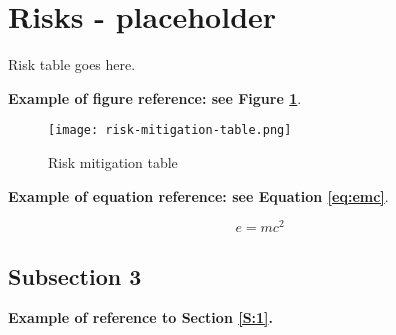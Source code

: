 \section{Risks - placeholder}

Risk table goes here.

\textbf{Example of figure reference: see Figure \ref{fig:example}}. 
\lipsum[5]

\begin{figure}[ht]
\centering\texttt{[image: risk-mitigation-table.png]}
\caption{Risk mitigation table}
\label{fig:example}
\end{figure}

\textbf{Example of equation reference: see Equation \eqref{eq:emc}}. 
\lipsum[6]

\begin{equation} 
\label{eq:emc}
e = mc^2
\end{equation}

\subsection{Subsection 3}

\textbf{Example of reference to Section \ref{S:1}.} 
\lipsum[7]
\lipsum[8]